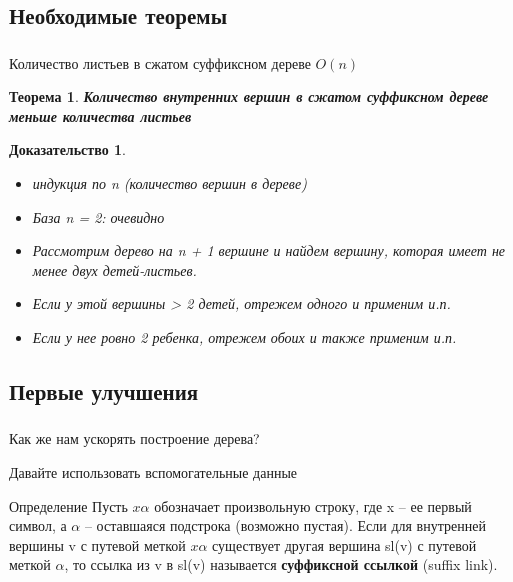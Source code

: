 \documentclass[t]{beamer}  %
\newtheorem{rtheorem}{Теорема}
\newtheorem{rproof}{Доказательство}
\begin{document}
\subsection{Необходимые теоремы}
\begin{frame}
	\frametitle{\insertsubsection}
	
	Количество листьев в сжатом суффиксном дереве $O(n)$
	
	\pause
	\begin{rtheorem}
		\textbf{Количество внутренних вершин в сжатом суффиксном дереве меньше количества листьев}
	\end{rtheorem}
	\pause
	\begin{rproof}
		\begin{itemize}
			\pause
			\item индукция по n (количество вершин в дереве) \pause
			\item База n = 2: очевидно \pause
			\item Рассмотрим дерево на n + 1 вершине и найдем вершину, которая имеет не менее двух детей-листьев. \pause
			\item Если у этой вершины > 2 детей, отрежем одного и применим и.п.
			\pause
			\item Если у нее ровно 2 ребенка, отрежем обоих и также применим и.п. 
		\end{itemize}
	\end{rproof}
\end{frame}


\subsection{Первые улучшения}
\begin{frame}
	\frametitle{\insertsubsection}
	\pause
	Как же нам ускорять построение дерева?
	
	\pause
	Давайте использовать вспомогательные данные
	\pause
	
	\begin{block}{Определение}
			Пусть $x\alpha$ обозначает произвольную строку, где x -- ее первый символ, а $\alpha$ -- оставшаяся подстрока (возможно пустая). Если для внутренней вершины v с путевой меткой $x\alpha$ существует другая вершина sl(v) с путевой меткой $\alpha$, то ссылка из v в sl(v) называется \textbf{суффиксной ссылкой} (suffix link).
	\end{block}
	
	
\end{frame}
\end{document}
